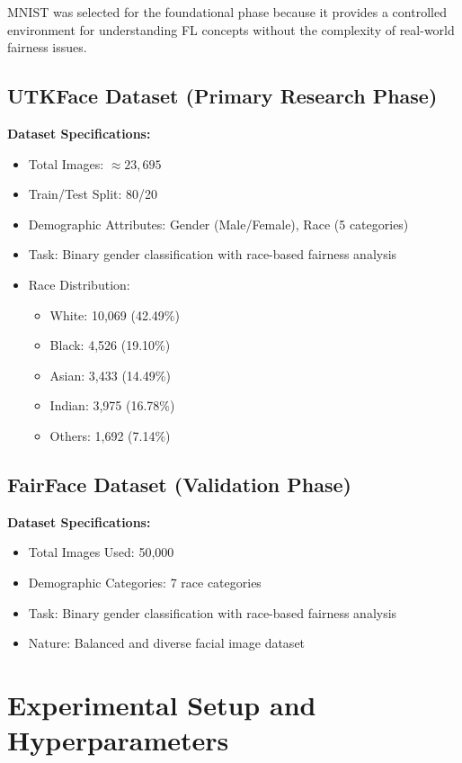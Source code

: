 \documentclass[11pt,a4paper]{report}
\begin{document}
MNIST was selected for the foundational phase because it provides a controlled environment for understanding FL concepts without the complexity of real-world fairness issues.

\subsection{UTKFace Dataset (Primary Research Phase)}

\textbf{Dataset Specifications:}
\begin{itemize}
    \item Total Images: $\approx 23,695$
    \item Train/Test Split: 80/20
    \item Demographic Attributes: Gender (Male/Female), Race (5 categories)
    \item Task: Binary gender classification with race-based fairness analysis
    \item Race Distribution:
    \begin{itemize}
        \item White: 10,069 (42.49\%)
        \item Black: 4,526 (19.10\%)
        \item Asian: 3,433 (14.49\%)
        \item Indian: 3,975 (16.78\%)
        \item Others: 1,692 (7.14\%)
    \end{itemize}
\end{itemize}

\subsection{FairFace Dataset (Validation Phase)}

\textbf{Dataset Specifications:}
\begin{itemize}
    \item Total Images Used: 50,000
    \item Demographic Categories: 7 race categories
    \item Task: Binary gender classification with race-based fairness analysis
    \item Nature: Balanced and diverse facial image dataset
\end{itemize}

\section{Experimental Setup and Hyperparameters}
\end{document}
